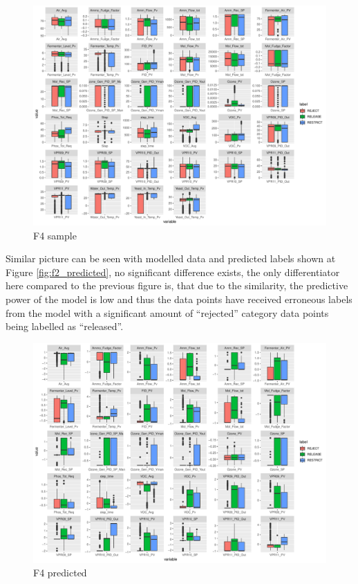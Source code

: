 \begin{figure}[ht]
    \centering
    \includegraphics[width=1.0\textwidth]{plots/f4-sample.pdf}
    \caption{F4 sample}
    \label{fig:f4_sample}
\end{figure}

Similar picture can be seen with modelled data and predicted labels shown at Figure \ref{fig:f2_predicted}, no significant difference exists, the only differentiator here compared to the previous figure is, that due to the similarity, the predictive power of the model is low and thus the data points have received erroneous labels from the model with a significant amount of ``rejected'' category data points being labelled as ``released''.

\begin{figure}[ht]
    \centering
    \includegraphics[width=1.0\textwidth]{plots/f4-predicted.pdf}
    \caption{F4 predicted}
    \label{fig:f4_predicted}
\end{figure}

